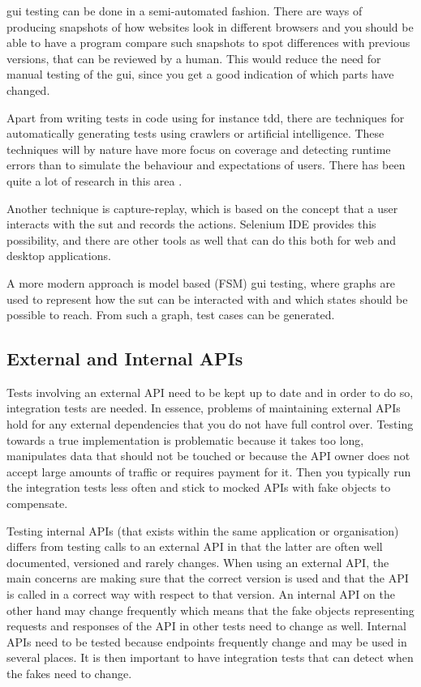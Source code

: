 \documentclass[11pt]{article}
\begin{document}
\gls{gui} testing can be done in a semi-automated fashion. There are ways of producing snapshots of how websites look in different browsers and you should be able to have a program compare such snapshots to spot differences with previous versions, that can be reviewed by a human. This would reduce the need for manual testing of the \gls{gui}, since you get a good indication of which parts have changed. %

Apart from writing tests in code using for instance \gls{tdd}, there are techniques for automatically generating tests using crawlers or artificial intelligence. These techniques will by nature have more focus on coverage and detecting runtime errors than to simulate the behaviour and expectations of users. There has been quite a lot of research in this area \cite{AutomatedTesting}\cite{AutomatedAcceptance}\cite{AutomatedAjax}.

Another technique is capture-replay, which is based on the concept that a user interacts with the \gls{sut} and records the actions. Selenium IDE provides this possibility, and there are other tools as well that can do this both for web and desktop applications.

A more modern approach is model based (FSM) \gls{gui} testing, where graphs are used to represent how the \gls{sut} can be interacted with and which states should be possible to reach. From such a graph, test cases can be generated.

\subsection{External and Internal APIs}

Tests involving an external API need to be kept up to date and in order to do so, integration tests are needed. In essence, problems of maintaining external APIs hold for any external dependencies that you do not have full control over. Testing towards a true implementation is problematic because it takes too long, manipulates data that should not be touched or because the API owner does not accept large amounts of traffic or requires payment for it. Then you typically run the integration tests less often and stick to mocked APIs with fake objects to compensate. \cite[questions~19-20]{Stenmark}

Testing internal APIs (that exists within the same application or organisation) differs from testing calls to an external API in that the latter are often well documented, versioned and rarely changes. When using an external API, the main concerns are making sure that the correct version is used and that the API is called in a correct way with respect to that version. An internal API on the other hand may change frequently which means that the fake objects representing requests and responses of the API in other tests need to change as well. Internal APIs need to be tested because endpoints frequently change and may be used in several places. It is then important to have integration tests that can detect when the fakes need to change. \cite[questions~34,~36]{Edelstam}
\end{document}

